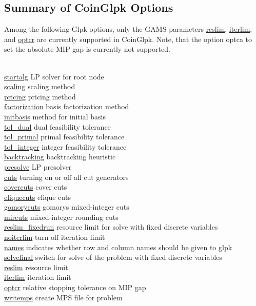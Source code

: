 \subsection{Summary of CoinGlpk Options}

Among the following Glpk options, only the GAMS parameters \hyperlink{glpkreslim}{reslim}, \hyperlink{glpkiterlim}{iterlim}, and \hyperlink{glpkoptcr}{optcr} are currently supported in CoinGlpk.
Note, that the option optca to set the absolute MIP gap is currently not supported.

\begin{tabbing}
\hspace {1.0in} \= \\
\hyperlink{glpkstartalg}
{startalg} \> LP solver for root node \\
\hyperlink{glpkscaling}
{scaling} \> scaling method \\
\hyperlink{pricing}
{pricing} \> pricing method \\
\hyperlink{factorization}
{factorization} \> basis factorization method \\
\hyperlink{initbasis}
{initbasis} \> method for initial basis \\
\hyperlink{glpktol_dual}
{tol\_dual} \> dual feasibility tolerance \\
\hyperlink{glpktol_primal}
{tol\_primal} \> primal feasibility tolerance \\
\hyperlink{glpktol_integer}
{tol\_integer} \> integer feasibility tolerance \\
\hyperlink{backtracking}
{backtracking} \> backtracking heuristic \\
\hyperlink{glpkpresolve}
{presolve} \> LP presolver \\
\hyperlink{glpkcuts}
{cuts} \> turning on or off all cut generators \\
\hyperlink{glpkcovercuts}
{covercuts} \> cover cuts \\
\hyperlink{glpkcliquecuts}
{cliquecuts} \> clique cuts \\
\hyperlink{glpkgomorycuts}
{gomorycuts} \> gomorys mixed-integer cuts \\
\hyperlink{glpkmircuts}
{mircuts} \> mixed-integer rounding cuts \\
\hyperlink{reslim_fixedrun}
{reslim\_fixedrun} \> resource limit for solve with fixed discrete variables \\
\hyperlink{noiterlim}
{noiterlim} \> turn off iteration limit \\
\hyperlink{glpknames}
{names} \> indicates whether row and column names should be given to glpk \\
\hyperlink{glpksolvefinal}
{solvefinal} \> switch for solve of the problem with fixed discrete variables \\
\hyperlink{glpkreslim}
{reslim} \> resource limit \\
\hyperlink{glpkiterlim}
{iterlim} \> iteration limit \\
\hyperlink{glpkoptcr}
{optcr} \> relative stopping tolerance on MIP gap \\
\hyperlink{glpkwritemps}
{writemps} \> create MPS file for problem
\end{tabbing}

